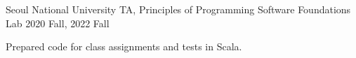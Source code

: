 

\begin{cventries}

  \cventry
  {Seoul National University} %
  {TA, Principles of Programming} %
  {Software Foundations Lab} %
  {2020 Fall, 2022 Fall} %
  {
    \begin{cvitems} %
      \item {Prepared code for class assignments and tests in Scala.}
    \end{cvitems}
  }

\end{cventries}
